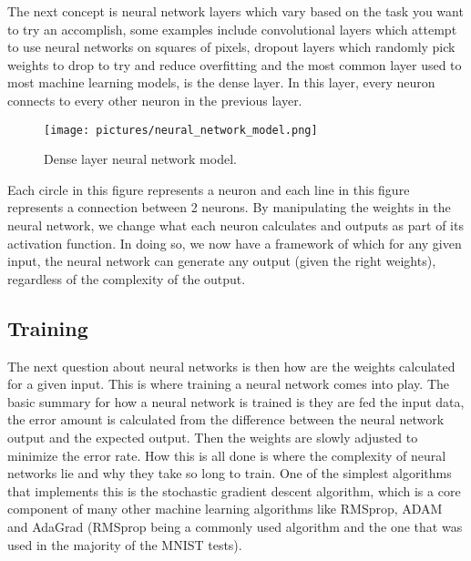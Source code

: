 \documentclass[a4paper,oneside,phd,etd]{BYUPhys}
\begin{document}
The next concept is neural network layers which vary based on the task you want to try an accomplish, some examples include convolutional layers which attempt to use neural networks on squares of pixels, dropout layers which randomly pick weights to drop to try and reduce overfitting and the most common layer used to most machine learning models, is the dense layer. In this layer, every neuron connects to every other neuron in the previous layer.
\begin{figure}[H]
\centering
\texttt{[image: pictures/neural\_network\_model.png]}
\caption{Dense layer neural network model\cite{fig:neural_network_model}.}
\label{fig:neural_network_model}
\end{figure}

Each circle in this figure represents a neuron and each line in this figure represents a connection between 2 neurons. By manipulating the weights in the neural network, we change what each neuron calculates and outputs as part of its activation function. In doing so, we now have a framework of which for any given input, the neural network can generate any output (given the right weights), regardless of the complexity of the output\cite{nielsen}. 

\subsection{Training}
The next question about neural networks is then how are the weights calculated for a given input. This is where training a neural network comes into play. The basic summary for how a neural network is trained is they are fed the input data, the error amount is calculated from the difference between the neural network output and the expected output. Then the weights are slowly adjusted to minimize the error rate. How this is all done is where the complexity of neural networks lie and why they take so long to train. One of the simplest algorithms that implements this is the stochastic gradient descent algorithm, which is a core component of many other machine learning algorithms like RMSprop, ADAM and AdaGrad (RMSprop being a commonly used algorithm and the one that was used in the majority of the MNIST tests). 
\end{document}
